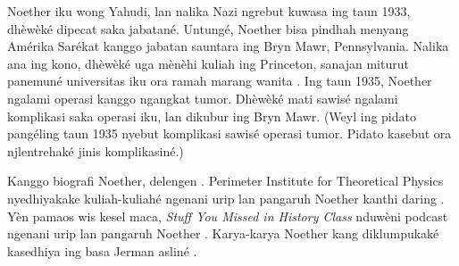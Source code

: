 \documentclass[../../../include/open-logic-section]{subfiles}
\begin{document}
Noether iku wong Yahudi, lan
nalika Nazi ngrebut kuwasa ing
taun 1933, dhèwèké dipecat
saka jabatané. Untungé,
Noether bisa pindhah menyang
Amérika Sarékat kanggo
jabatan sauntara ing Bryn Mawr,
Pennsylvania. Nalika ana ing
kono, dhèwèké uga mènèhi
kuliah ing Princeton, sanajan
miturut panemuné universitas
iku ora ramah marang wanita
\citep[81]{Dick1981}. Ing taun
1935, Noether ngalami operasi
kanggo ngangkat tumor.
Dhèwèké mati sawisé ngalami
komplikasi saka operasi
iku, lan dikubur ing Bryn Mawr.
(Weyl ing pidato pangéling taun 1935 nyebut komplikasi sawisé operasi tumor. Pidato kasebut ora njlentrehaké jinis komplikasiné.)

\begin{reading}
Kanggo biografi Noether, delengen
\citet{Dick1981}. Perimeter
Institute for Theoretical Physics
nyedhiyakake kuliah-kuliahé
ngenani urip lan pangaruh
Noether kanthi daring
\citep{Perimeter2015}.
Yèn pamaos wis kesel maca,
\emph{Stuff You Missed in History Class}
nduwèni podcast ngenani urip
lan pangaruh Noether
\citep{Frey2015}. Karya-karya
Noether kang diklumpukaké
kasedhiya ing basa Jerman
asliné \citep{Noether1983}.
\end{reading}
\end{document}
